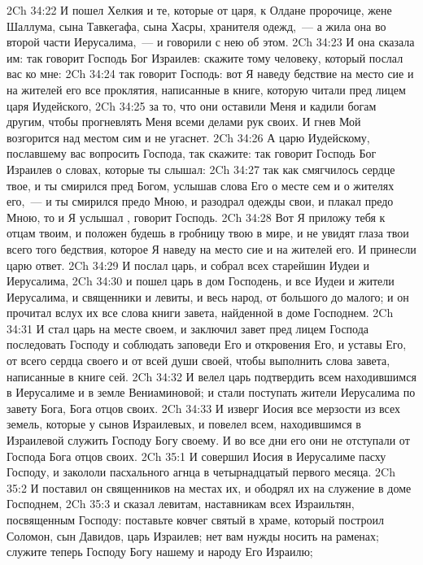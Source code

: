 \vs 2Ch 34:22 И пошел Хелкия и те, которые от царя, к Олдане пророчице, жене Шаллума, сына Тавкегафа, сына Хасры, хранителя одежд,~--- а жила она во второй части Иерусалима,~--- и говорили с нею об этом.
\vs 2Ch 34:23 И она сказала им: так говорит Господь Бог Израилев: скажите тому человеку, который послал вас ко мне:
\vs 2Ch 34:24 так говорит Господь: вот Я наведу бедствие на место сие и на жителей его все проклятия, написанные в книге, которую читали пред лицем царя Иудейского,
\vs 2Ch 34:25 за то, что они оставили Меня и кадили богам другим, чтобы прогневлять Меня всеми делами рук своих. И гнев Мой возгорится над местом сим и не угаснет.
\vs 2Ch 34:26 А царю Иудейскому, пославшему вас вопросить Господа, так скажите: так говорит Господь Бог Израилев о словах, которые ты слышал:
\vs 2Ch 34:27 так как смягчилось сердце твое, и ты смирился пред Богом, услышав слова Его о месте сем и о жителях его,~--- и ты смирился предо Мною, и разодрал одежды свои, и плакал предо Мною, то и Я услышал , говорит Господь.
\vs 2Ch 34:28 Вот Я приложу тебя к отцам твоим, и положен будешь в гробницу твою в мире, и не увидят глаза твои всего того бедствия, которое Я наведу на место сие и на жителей его. И принесли царю ответ.
\rsbpar\vs 2Ch 34:29 И послал царь, и собрал всех старейшин Иудеи и Иерусалима,
\vs 2Ch 34:30 и пошел царь в дом Господень, и  все Иудеи и жители Иерусалима, и священники и левиты, и весь народ, от большого до малого; и он прочитал вслух их все слова книги завета, найденной в доме Господнем.
\vs 2Ch 34:31 И стал царь на месте своем, и заключил завет пред лицем Господа последовать Господу и соблюдать заповеди Его и откровения Его, и уставы Его, от всего сердца своего и от всей души своей, чтобы выполнить слова завета, написанные в книге сей.
\vs 2Ch 34:32 И велел царь подтвердить  всем находившимся в Иерусалиме и в земле Вениаминовой; и стали поступать жители Иерусалима по завету Бога, Бога отцов своих.
\vs 2Ch 34:33 И изверг Иосия все мерзости из всех земель, которые у сынов Израилевых, и повелел всем, находившимся в  Израилевой служить Господу Богу своему. И во все дни  его они не отступали от Господа Бога отцов своих.
\vs 2Ch 35:1 И совершил Иосия в Иерусалиме пасху Господу, и закололи пасхального агнца в четырнадцатый  первого месяца.
\vs 2Ch 35:2 И поставил он священников на местах их, и ободрял их на служение в доме Господнем,
\vs 2Ch 35:3 и сказал левитам, наставникам всех Израильтян, посвященным Господу: поставьте ковчег святый в храме, который построил Соломон, сын Давидов, царь Израилев; нет вам нужды носить  на раменах; служите теперь Господу Богу нашему и народу Его Израилю;
